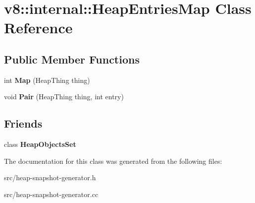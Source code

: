 \hypertarget{classv8_1_1internal_1_1_heap_entries_map}{}\section{v8\+:\+:internal\+:\+:Heap\+Entries\+Map Class Reference}
\label{classv8_1_1internal_1_1_heap_entries_map}
\subsection*{Public Member Functions}
\begin{DoxyCompactItemize}
\item 
\hypertarget{classv8_1_1internal_1_1_heap_entries_map_a8f21b0b962e46faf2ee21f2faff269fb}{}int {\bfseries Map} (Heap\+Thing thing)\label{classv8_1_1internal_1_1_heap_entries_map_a8f21b0b962e46faf2ee21f2faff269fb}

\item 
\hypertarget{classv8_1_1internal_1_1_heap_entries_map_a42f2dcdfaab17a8e5ce6358cdde4b856}{}void {\bfseries Pair} (Heap\+Thing thing, int entry)\label{classv8_1_1internal_1_1_heap_entries_map_a42f2dcdfaab17a8e5ce6358cdde4b856}

\end{DoxyCompactItemize}
\subsection*{Friends}
\begin{DoxyCompactItemize}
\item 
\hypertarget{classv8_1_1internal_1_1_heap_entries_map_aa92f9dd7ce94ea20ac88110127675abc}{}class {\bfseries Heap\+Objects\+Set}\label{classv8_1_1internal_1_1_heap_entries_map_aa92f9dd7ce94ea20ac88110127675abc}

\end{DoxyCompactItemize}


The documentation for this class was generated from the following files\+:\begin{DoxyCompactItemize}
\item 
src/heap-\/snapshot-\/generator.\+h\item 
src/heap-\/snapshot-\/generator.\+cc\end{DoxyCompactItemize}
